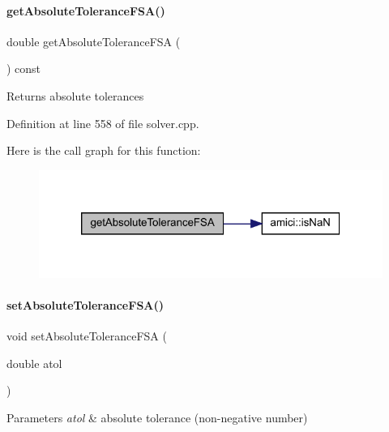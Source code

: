 \paragraph{\texorpdfstring{getAbsoluteToleranceFSA()}{getAbsoluteToleranceFSA()}}
{\footnotesize\ttfamily double get\+Absolute\+Tolerance\+F\+SA (\begin{DoxyParamCaption}{ }\end{DoxyParamCaption}) const}

\begin{DoxyReturn}{Returns}
absolute tolerances 
\end{DoxyReturn}


Definition at line 558 of file solver.\+cpp.

Here is the call graph for this function\+:
\nopagebreak
\begin{figure}[H]
\begin{center}
\leavevmode
\includegraphics[width=320pt]{classamici_1_1_solver_ac4b72ec37a7ab41b520b5c540a382165_cgraph}
\end{center}
\end{figure}
\mbox{\label{classamici_1_1_solver_a96ccd686d0ce5c2c43071537e088e42a}} 
\paragraph{\texorpdfstring{setAbsoluteToleranceFSA()}{setAbsoluteToleranceFSA()}}
{\footnotesize\ttfamily void set\+Absolute\+Tolerance\+F\+SA (\begin{DoxyParamCaption}\item[{double}]{atol }\end{DoxyParamCaption})}


\begin{DoxyParams}{Parameters}
{\em atol} & absolute tolerance (non-\/negative number) \\
\hline
\end{DoxyParams}


